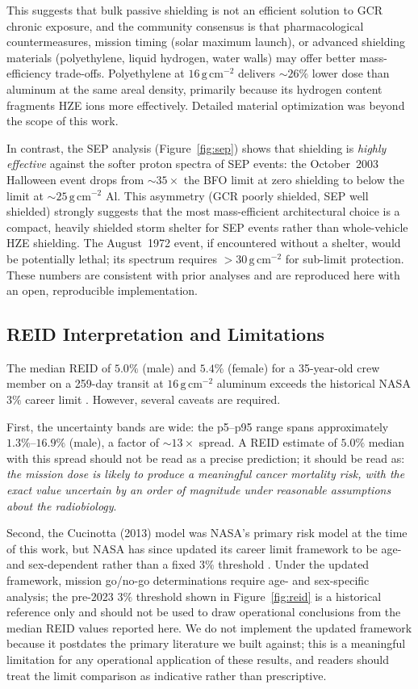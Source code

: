 This suggests that bulk passive shielding is not an efficient solution to
GCR chronic exposure, and the community consensus \citep{durante2011} is
that pharmacological countermeasures, mission timing (solar maximum launch),
or advanced shielding materials (polyethylene, liquid hydrogen, water walls)
may offer better mass-efficiency trade-offs.
Polyethylene at $16\,\mathrm{g\,cm^{-2}}$ delivers $\sim\!26\%$ lower
dose than aluminum at the same areal density, primarily because its hydrogen
content fragments HZE ions more effectively.
Detailed material optimization was beyond the scope of this work.

In contrast, the SEP analysis (Figure~\ref{fig:sep}) shows that shielding
is \emph{highly effective} against the softer proton spectra of SEP events:
the October~2003 Halloween event drops from $\sim\!35\times$ the BFO limit
at zero shielding to below the limit at $\sim\!25\,\mathrm{g\,cm^{-2}}$ Al.
This asymmetry (GCR poorly shielded, SEP well shielded) strongly suggests
that the most mass-efficient architectural choice is a compact, heavily shielded
storm shelter for SEP events rather than whole-vehicle HZE shielding.
The August~1972 event, if encountered without a shelter, would be
potentially lethal; its spectrum requires $>30\,\mathrm{g\,cm^{-2}}$
for sub-limit protection.
These numbers are consistent with prior analyses \citep{cucinotta2010}
and are reproduced here with an open, reproducible implementation.

\subsection{REID Interpretation and Limitations}
\label{sec:discuss_reid}

The median REID of $5.0\%$ (male) and $5.4\%$ (female) for a 35-year-old
crew member on a 259-day transit at $16\,\mathrm{g\,cm^{-2}}$ aluminum
exceeds the historical NASA $3\%$ career limit \citep{cucinotta2013}.
However, several caveats are required.

First, the uncertainty bands are wide: the p5--p95 range spans
approximately $1.3\%$--$16.9\%$ (male), a factor of $\sim\!13\times$ spread.
A REID estimate of $5.0\%$ median with this spread should not be read as
a precise prediction; it should be read as: \emph{the mission dose is likely
to produce a meaningful cancer mortality risk, with the exact value uncertain
by an order of magnitude under reasonable assumptions about the radiobiology}.

Second, the Cucinotta (2013) model was NASA's primary risk model at the
time of this work, but NASA has since updated its career limit framework
to be age- and sex-dependent rather than a fixed $3\%$ threshold
\citep{nasa2023}.
Under the updated framework, mission go/no-go determinations require
age- and sex-specific analysis; the pre-2023 $3\%$ threshold shown in
Figure~\ref{fig:reid} is a historical reference only and should not be
used to draw operational conclusions from the median REID values
reported here.
We do not implement the updated framework because it postdates the
primary literature we built against; this is a meaningful limitation
for any operational application of these results, and readers should
treat the limit comparison as indicative rather than prescriptive.

